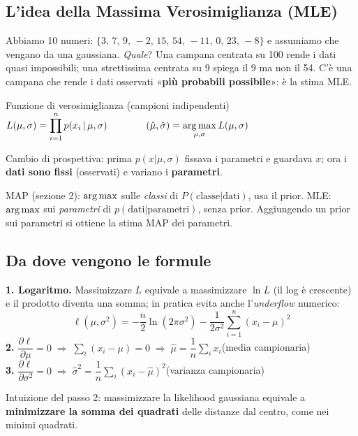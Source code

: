 \subsection{L'idea della Massima Verosimiglianza (MLE)}
\begin{intuizione}
Abbiamo 10 numeri: $\{3,\,7,\,9,\,-2,\,15,\,54,\,-11,\,0,\,23,\,-8\}$ e assumiamo che vengano da una gaussiana. \emph{Quale}? Una campana centrata su 100 rende i dati quasi impossibili; una strettissima centrata su 9 spiega il 9 ma non il 54. C'è una campana che rende i dati osservati «\textbf{più probabili possibile}»: è la stima MLE.
\end{intuizione}
\begin{formulat}{Funzione di verosimiglianza (campioni indipendenti)}
$\displaystyle L(\mu,\sigma)=\prod_{i=1}^{n} p(x_i\,|\,\mu,\sigma)
\qquad\qquad (\hat\mu,\hat\sigma)=\operatorname*{arg\,max}_{\mu,\sigma} L(\mu,\sigma)$
\end{formulat}
Cambio di prospettiva: prima $p(x|\mu,\sigma)$ fissava i parametri e guardava $x$; ora i \textbf{dati sono fissi} (osservati) e variano i \textbf{parametri}.

\begin{mlbox}
MAP (sezione 2): $\operatorname*{arg\,max}$ sulle \emph{classi} di $P(\text{classe}|\text{dati})$, usa il prior. MLE: $\operatorname*{arg\,max}$ sui \emph{parametri} di $p(\text{dati}|\text{parametri})$, senza prior. Aggiungendo un prior sui parametri si ottiene la stima MAP dei parametri.
\end{mlbox}

\subsection{Da dove vengono le formule}
\begin{tecnica}
\textbf{1. Logaritmo.} Massimizzare $L$ equivale a massimizzare $\ln L$ (il log è crescente) e il prodotto diventa una somma; in pratica evita anche l'\emph{underflow} numerico:
\[
\ell(\mu,\sigma^2)=-\frac n2\ln(2\pi\sigma^2)-\frac1{2\sigma^2}\sum_{i=1}^{n}(x_i-\mu)^2
\]
\textbf{2.} $\dfrac{\partial\ell}{\partial\mu}=0\;\Rightarrow\;\sum_i(x_i-\mu)=0\;\Rightarrow\;\hat\mu=\dfrac1n\sum_i x_i$\qquad (media campionaria)\\[4pt]
\textbf{3.} $\dfrac{\partial\ell}{\partial\sigma^2}=0\;\Rightarrow\;\hat\sigma^2=\dfrac1n\sum_i (x_i-\hat\mu)^2$\qquad (varianza campionaria)
\end{tecnica}
Intuizione del passo 2: massimizzare la likelihood gaussiana equivale a \textbf{minimizzare la somma dei quadrati} delle distanze dal centro, come nei minimi quadrati.

